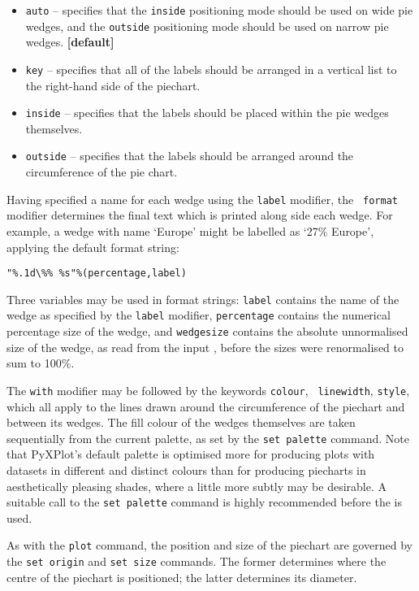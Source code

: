 \noindent
\begin{itemize}
\item {\tt auto} -- specifies that the {\tt inside} positioning mode should be used on wide pie wedges, and the {\tt outside} positioning mode should be used on narrow pie wedges. {\bf [default]}
\item {\tt key} -- specifies that all of the labels should be arranged in a vertical list to the right-hand side of the piechart.
\item {\tt inside} -- specifies that the labels should be placed within the pie wedges themselves.
\item {\tt outside} -- specifies that the labels should be arranged around the circumference of the pie chart.
\end{itemize}

Having specified a name for each wedge using the {\tt label} modifier, the {\tt
format} modifier determines the final text which is printed along side each
wedge.  For example, a wedge with name `Europe' might be labelled as `27\%
Europe', applying the default format string:
\begin{verbatim}
"%.1d\%% %s"%(percentage,label)
\end{verbatim}
Three variables may be used in format strings: {\tt label} contains the name of
the wedge as specified by the {\tt label} modifier, {\tt percentage} contains
the numerical percentage size of the wedge, and {\tt wedgesize} contains the
absolute unnormalised size of the wedge, as read from the input \datafile,
before the sizes were renormalised to sum to 100\%.

The {\tt with} modifier may be followed by the keywords {\tt colour}, {\tt
linewidth}, {\tt style}, which all apply to the lines drawn around the
circumference of the piechart and between its wedges. The fill colour of the
wedges themselves are taken sequentially from the current palette, as set by
the {\tt set palette} command. Note that PyXPlot's default palette is optimised
more for producing plots with datasets in different and distinct colours than
for producing piecharts in aesthetically pleasing shades, where a little more
subtly may be desirable. A suitable call to the {\tt set palette} command is
highly recommended before the  is used.

As with the {\tt plot} command, the position and size of the piechart are
governed by the {\tt set origin} and {\tt set size} commands. The former
determines where the centre of the piechart is positioned; the latter
determines its diameter.

